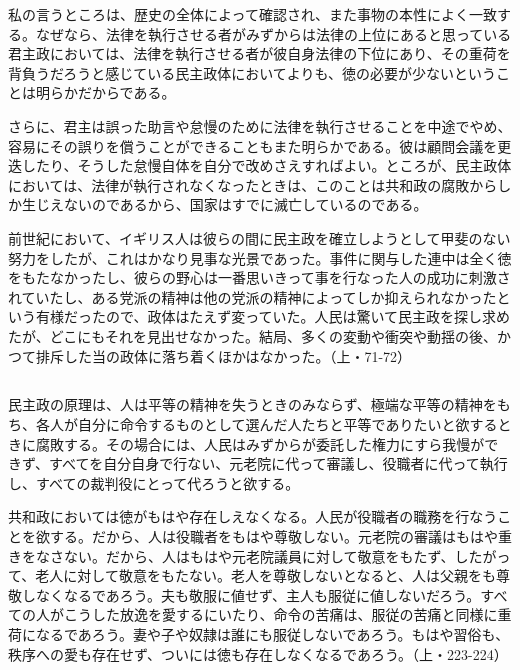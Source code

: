 私の言うところは、歴史の全体によって確認され、また事物の本性によく一致する。なぜなら、法律を執行させる者がみずからは法律の上位にあると思っている君主政においては、法律を執行させる者が彼自身法律の下位にあり、その重荷を背負うだろうと感じている民主政体においてよりも、徳の必要が少ないということは明らかだからである。

さらに、君主は誤った助言や怠慢のために法律を執行させることを中途でやめ、容易にその誤りを償うことができることもまた明らかである。彼は顧問会議を更迭したり、そうした怠慢自体を自分で改めさえすればよい。ところが、民主政体においては、法律が執行されなくなったときは、このことは共和政の腐敗からしか生じえないのであるから、国家はすでに滅亡しているのである。

前世紀において、イギリス人は彼らの間に民主政を確立しようとして甲斐のない努力をしたが、これはかなり見事な光景であった。事件に関与した連中は全く徳をもたなかったし、彼らの野心は一番思いきって事を行なった人の成功に刺激されていたし、ある党派の精神は他の党派の精神によってしか抑えられなかったという有様だったので、政体はたえず変っていた。人民は驚いて民主政を探し求めたが、どこにもそれを見出せなかった。結局、多くの変動や衝突や動揺の後、かつて排斥した当の政体に落ち着くほかはなかった。（上・71-72）

\subsection{}


民主政の原理は、人は平等の精神を失うときのみならず、極端な平等の精神をもち、各人が自分に命令するものとして選んだ人たちと平等でありたいと欲するときに腐敗する。その場合には、人民はみずからが委託した権力にすら我慢ができず、すべてを自分自身で行ない、元老院に代って審議し、役職者に代って執行し、すべての裁判役にとって代ろうと欲する。

共和政においては徳がもはや存在しえなくなる。人民が役職者の職務を行なうことを欲する。だから、人は役職者をもはや尊敬しない。元老院の審議はもはや重きをなさない。だから、人はもはや元老院議員に対して敬意をもたず、したがって、老人に対して敬意をもたない。老人を尊敬しないとなると、人は父親をも尊敬しなくなるであろう。夫も敬服に値せず、主人も服従に値しないだろう。すべての人がこうした放逸を愛するにいたり、命令の苦痛は、服従の苦痛と同様に重荷になるであろう。妻や子や奴隷は誰にも服従しないであろう。もはや習俗も、秩序への愛も存在せず、ついには徳も存在しなくなるであろう。（上・223-224）

\subsection{}



